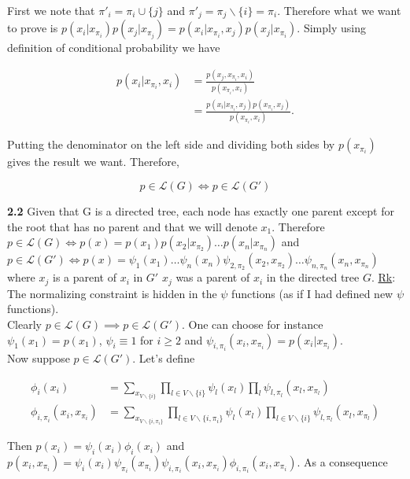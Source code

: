 \documentclass[a4paper, 11pt]{article}
\begin{document}
First we note that $\pi'_i = \pi_i \cup \{j\}$ and $\pi'_j = \pi_j \backslash \{i\} = \pi_i$. Therefore what we want to prove is
$p(x_i|x_{\pi_i}) p(x_j|x_{\pi_j}) = p(x_i|x_{\pi_i}, x_j) p(x_j|x_{\pi_i})$. Simply using definition of conditional
probability we have

\begin{align*}
  p(x_i|x_{\pi_i}, x_i) &= \frac{p(x_j, x_{\pi_i}, x_i)}{p(x_{\pi_i}, x_i)} \\
  &= \frac{p(x_i|x_{\pi_i}, x_j)p(x_{\pi_i}, x_j)}{p(x_{\pi_i}, x_i)}.
\end{align*}

Putting the denominator on the left side and dividing both sides by $p(x_{\pi_i})$ gives the result we want. Therefore,

\begin{equation}
p \in \mathcal{L}(G) \iff p \in \mathcal{L}(G') 
\end{equation}

\textbf{2.2} Given that G is a directed tree, each node has exactly one parent except for the root that has no parent
and that we will denote $x_1$. Therefore $p \in \mathcal{L}(G) \iff p(x) = p(x_1)p(x_2|x_{\pi_2})\dots
p(x_n|x_{\pi_n})$ and $p \in \mathcal{L}(G') \iff p(x) =
\psi_1(x_1)\dots\psi_n(x_n)\psi_{2,\pi_2}(x_2,x_{\pi_2})\dots\psi_{n,\pi_n}(x_n,x_{\pi_n})$ where $x_j$ is a
parent of $x_i$ in $G'$ $x_j$ was a parent of $x_i$ in the directed tree $G$. \underline{Rk}: The normalizing constraint 
is hidden in the $\psi$ functions (as if I had defined new $\psi$ functions).\\

Clearly $p \in \mathcal{L}(G) \implies p \in \mathcal{L}(G')$. One can choose for instance $\psi_1(x_1) = p(x_1)$, $\psi_i
\equiv 1$ for $i \geq 2$ and $\psi_{i, \pi_i}(x_i, x_{\pi_i}) = p(x_i|x_{\pi_i})$.\\

Now suppose $p \in \mathcal{L}(G')$. Let's define 

\begin{align*}
\phi_i(x_i) &= \sum_{x_{V\backslash \{i\}}} \prod_{l \in V\backslash \{i\}} \psi_l(x_l) \prod_l \psi_{l, \pi_l}(x_l, x_{\pi_l}) \\
\phi_{i,\pi_i}(x_i, x_{\pi_i}) &= \sum_{x_{V\backslash \{i, \pi_i\}}} \prod_{l \in V\backslash \{i, \pi_i\}} \psi_l(x_l) 
\prod_{l \in V\backslash \{i\}} \psi_{l, \pi_l}(x_l, x_{\pi_l})
\end{align*}

Then $p(x_i) = \psi_i(x_i) \phi_i(x_i)$ and $p(x_i, x_{\pi_i}) = \psi_i (x_i) \psi_{\pi_i} (x_{\pi_i}) \psi_{i,\pi_i}(x_i,x_{\pi_i}) 
\phi_{i, \pi_i}(x_i, x_{\pi_i})$. As a consequence
\end{document}
